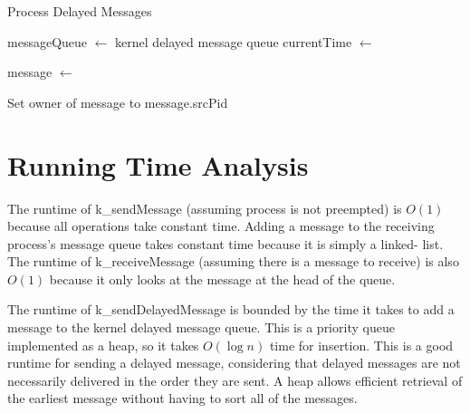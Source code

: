 \documentclass[12pt]{report}
\begin{document}
    \begin{algorithm}
    \caption{Process Delayed Messages}
    \label{code:process_delayed_messages}
    \begin{algorithmic}[1]
            \State messageQueue $\gets$ kernel delayed message queue
            \State currentTime $\gets$ 

                \State \Return
            \EndIf

            \Loop
                \State message $\gets$ 

                    \State \Return
                \EndIf

                \State {}
                \State Set owner of message to message.srcPid
                \State {}
            \EndLoop
        \EndFunction
    \end{algorithmic}
    \end{algorithm}

\section{Running Time Analysis}

    The runtime of k\_sendMessage (assuming process is not preempted) is $O(1)$
    because all operations take constant time. Adding a message to the receiving
    process's message queue  takes constant time because it is simply a linked-
    list. The runtime of k\_receiveMessage (assuming there is a message to
    receive)  is also $O(1)$ because it only looks at the message at the head of
    the queue.

    The runtime of k\_sendDelayedMessage is bounded by the time it takes to add
    a  message to the kernel delayed message queue. This is a priority queue
    implemented  as a heap, so it takes $O(\log n)$ time for insertion. This is
    a good runtime for sending a delayed message, considering that delayed
    messages are not necessarily delivered in the order they are sent. A heap
    allows efficient retrieval of the earliest message without having to sort
    all of the messages.
\end{document}
